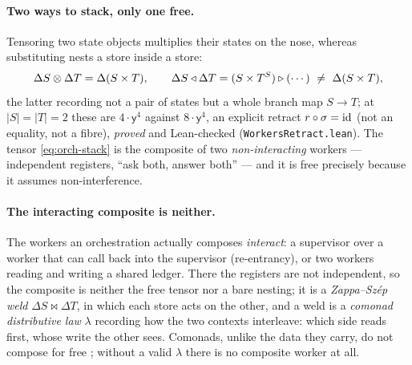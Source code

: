 \paragraph{Two ways to stack, only one free.}
Tensoring two state objects multiplies their states on the nose, whereas substituting nests a store
inside a store:
\begin{equation}\label{eq:orch-stack}
  \Delta S\otimes\Delta T=\Delta(S\times T),
  \qquad
  \Delta S\tri\Delta T=(S\times T^{S})\triangleright(\cdots)\ \ne\ \Delta(S\times T),
\end{equation}
the latter recording not a pair of states but a whole branch map $S\to T$; at $|S|=|T|=2$ these
are $4\cdot\mathsf{y}^4$ against $8\cdot\mathsf{y}^4$, an explicit retract $r\circ\sigma=\mathrm{id}$ (not
an equality, not a fibre), \emph{proved} and Lean-checked (\texttt{WorkersRetract.lean}). The
tensor \eqref{eq:orch-stack} is the composite of two \emph{non-interacting} workers --- independent
registers, ``ask both, answer both'' --- and it is free precisely because it assumes non-interference.

\paragraph{The interacting composite is neither.}
The workers an orchestration actually composes \emph{interact}: a supervisor over a worker that can
call back into the supervisor (re-entrancy), or two workers reading and writing a shared ledger.
There the registers are not independent, so the composite is neither the free tensor nor a bare
nesting; it is a \emph{Zappa--Sz\'ep weld} $\Delta S\bowtie\Delta T$, in which each store acts on
the other, and a weld is a \emph{comonad distributive law} $\lambda$ recording how the two contexts
interleave: which side reads first, whose write the other sees. Comonads, unlike the data they
carry, do not compose for free \cite{AhmanUustaluDL}; without a valid $\lambda$ there is no composite
worker at all.

